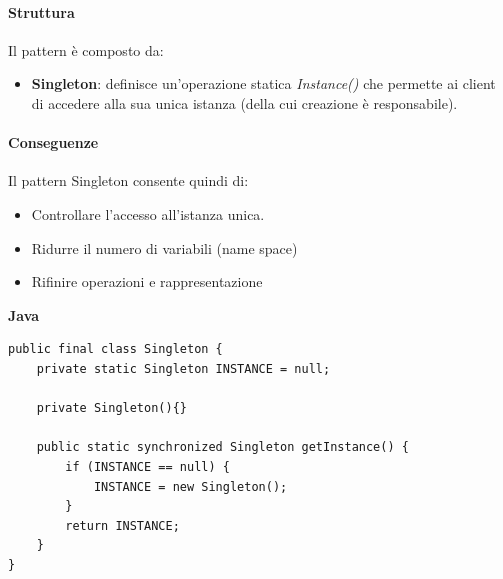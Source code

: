 \paragraph{Struttura} Il pattern è composto da:
\begin{itemize}
    \item \textbf{Singleton}: definisce un'operazione statica \textit{Instance()} che permette ai client di accedere alla sua unica istanza (della cui creazione è responsabile).
\end{itemize}

\paragraph{Conseguenze} Il pattern Singleton consente quindi di:
\begin{itemize}
    \item Controllare l'accesso all'istanza unica.
    \item Ridurre il numero di variabili (name space)
    \item Rifinire operazioni e rappresentazione
\end{itemize}

\newpage

\textbf{Java}

\begin{verbatim}
public final class Singleton { 
    private static Singleton INSTANCE = null; 
    
    private Singleton(){} 
    
    public static synchronized Singleton getInstance() { 
        if (INSTANCE == null) { 
            INSTANCE = new Singleton(); 
        } 
        return INSTANCE; 
    } 
}
\end{verbatim}

\newpage